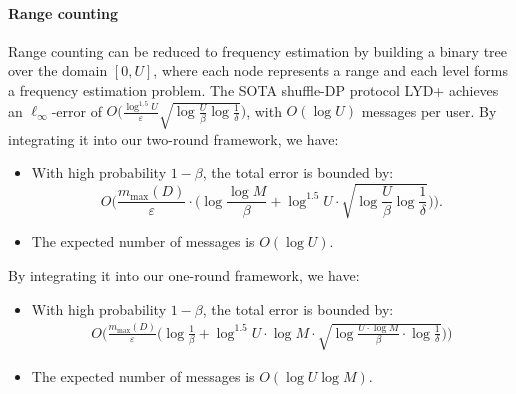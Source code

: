 \paragraph{Range counting}

Range counting can be reduced to frequency estimation by building a binary tree over the domain $[0,U]$, where each node represents a range and each level forms a frequency estimation problem.
The SOTA shuffle-DP protocol LYD+ \cite{luo2025rm2} achieves an $\ell_{\infty}$-error of
$O\big(\tfrac{\log^{1.5} U}{\varepsilon} \sqrt{\log \tfrac{U}{\beta} \log \tfrac{1}{\delta}}\big)$, with $O(\log U)$ messages per user.
By integrating it into our two-round framework, we have:
\begin{itemize}
\item With high probability $1-\beta$, the total error is bounded by: 
$$
O\Big(\frac{m_{\max}(D)}{\varepsilon}\cdot \big(\log\frac{\log M}{\beta}+\log^{1.5}U\cdot\sqrt{\log \frac{U}{\beta}\log\frac{1}{\delta}}\big)\Big).
$$
\item The expected number of messages is $O(\log U)$.
\end{itemize}

By integrating it into our one-round framework, we have:
\begin{itemize}
\item With high probability $1-\beta$, the total error is bounded by: 
\[
\begin{aligned}
O\Bigg(
\frac{m_{\max}(D)}{\varepsilon}\Big(
\log \frac{1}{\beta} + \log^{1.5} U \cdot \log M \cdot \sqrt{
\log \frac{U\cdot\log M}{\beta}
\cdot \log \frac{1}{\delta}
}
\Big)
\Bigg)
\end{aligned}
\]

\item The expected number of messages is $O(\log U \log M)$.
\end{itemize}


